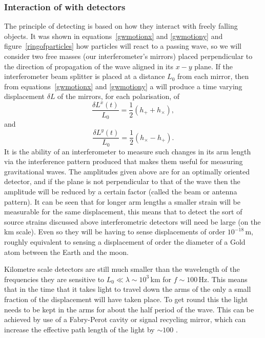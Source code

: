 \subsubsection{Interaction of \gws with detectors}
The principle of detecting \gws is based on how they interact with freely falling objects. It
was shown in equations~\ref{gwmotionx} and \ref{gwmotiony} and figure~\ref{ringofparticles} how
particles will react to a passing wave, so we will consider two free masses (our interferometer's
mirrors) placed perpendicular to the direction of propagation of the wave aligned in its $x-y$
plane. If the interferometer beam splitter is placed at a distance $L_0$ from each mirror, then from
equations~\ref{gwmotionx} and \ref{gwmotiony} a \gw will produce a time varying displacement
$\delta{}L$ of the mirrors, for each polarisation, of
\begin{equation}
\frac{\delta{}L^x(t)}{L_0} = \frac{1}{2}(h_+ + h_{\times}),
\end{equation}
and
\begin{equation}
\frac{\delta{}L^y(t)}{L_0} = \frac{1}{2}(h_{\times} - h_+).
\end{equation}
It is the ability of an interferometer to measure such changes in its arm length via the
interference pattern produced that makes them useful for measuring gravitational waves. The
amplitudes given above are for an optimally oriented detector, and if the plane is not perpendicular
to that of the wave 
then the amplitude will be reduced by a certain factor (called the beam or antenna pattern). It can
be seen that for longer arm lengths a smaller \gw strain will be measurable for the same
displacement, this means that to detect the sort of source strains discussed above interferometric
\gw detectors will need be large (on the km scale). Even so they will be having to sense
displacements of order $10^{-18}$\,m, roughly equivalent to sensing a displacement of order the
diameter of a Gold atom between the Earth and the moon.

Kilometre scale detectors are still much smaller than the wavelength of the \gw frequencies they
are sensitive to $L_0 \ll \lambda \sim 10^3$\,km for $f \sim 100$\,Hz. This means that in the time
that it takes light to travel down the arms of the \ifo only a small fraction of the displacement
will have taken place. To get round this the light needs to be kept in the arms for about the half
period of the wave. This can be achieved by use of a Fabry-Perot cavity or signal recycling mirror,
which can increase the effective path length of the light by $\sim 100$ \cite{Schutz:1999}.

